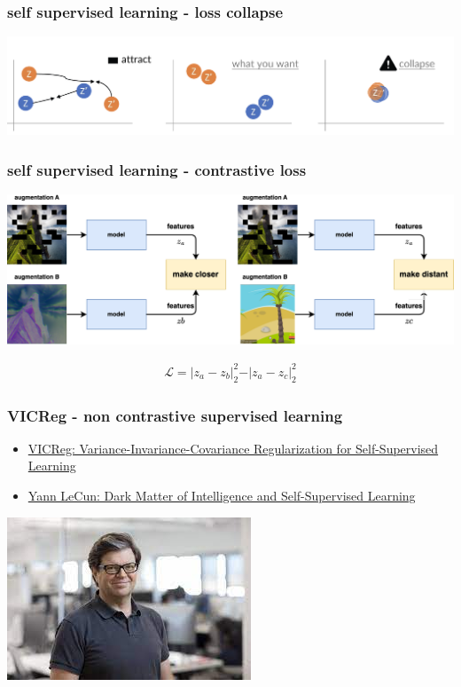 \documentclass{beamer}
\begin{document}
\begin{frame}
\frametitle{self supervised learning - loss collapse}
  
    \centering
    \includegraphics[scale=0.45]{../images/contrastive_loss.png}
  
\end{frame}



\begin{frame}
\frametitle{self supervised learning - contrastive loss}
  
    \centering
    \includegraphics[scale=0.5]{../diagrams/self_supervised/self_supervised-contrastive.png}

    \begin{align*}
      \mathcal{L} = \vert z_a - z_b \vert^2_2 - \vert z_a - z_c \vert^2_2
    \end{align*}

\end{frame}



\begin{frame}
  \frametitle{VICReg - non contrastive supervised learning}

    \begin{itemize}
      \item \href{https://arxiv.org/abs/2105.04906}{VICReg: Variance-Invariance-Covariance Regularization for Self-Supervised Learning} 
      \item \href{https://www.youtube.com/watch?v=SGzMElJ11Cc}{Yann LeCun: Dark Matter of Intelligence and Self-Supervised Learning} 
    \end{itemize}
    
    \centering
    \includegraphics[scale=0.5]{../images/prof_yann_lecun.jpg}

\end{frame}
\end{document}
